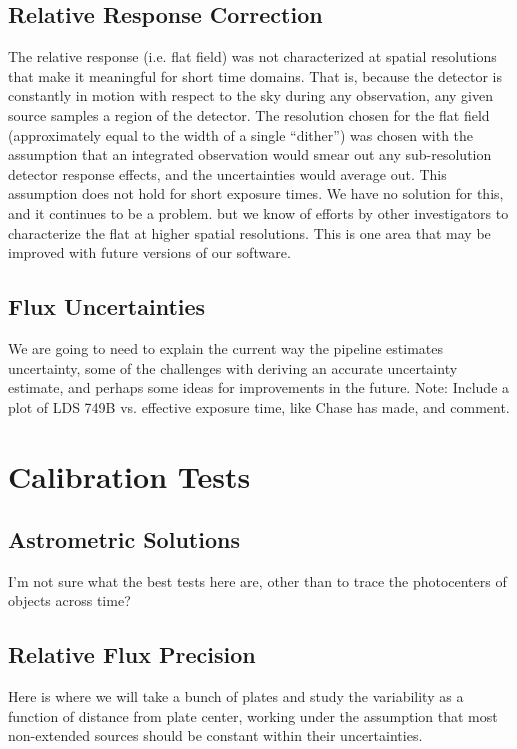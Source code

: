 \documentclass[preprint]{aastex}
\begin{document}
\subsection{Relative Response Correction}
The relative response (i.e. flat field) was not characterized at spatial resolutions that make it meaningful for short time domains. That is, because the detector is constantly in motion with respect to the sky during any observation, any given source samples a region of the detector. The resolution chosen for the flat field (approximately equal to the width of a single ``dither'') was chosen with the assumption that an integrated observation would smear out any sub-resolution detector response effects, and the uncertainties would average out. This assumption does not hold for short exposure times. We have no solution for this, and it continues to be a problem. but we know of efforts by other investigators to characterize the flat at higher spatial resolutions.  This is one area that may be improved with future versions of our software.

\subsection{Flux Uncertainties}
{\color{red}We are going to need to explain the current way the pipeline estimates uncertainty, some of the challenges with deriving an accurate uncertainty estimate, and perhaps some ideas for improvements in the future.}
{\color{red}Note: Include a plot of LDS 749B vs. effective exposure time, like Chase has made, and comment.}

\section{Calibration Tests}
\label{calibration}

\subsection{Astrometric Solutions}
{\color{red}I'm not sure what the best tests here are, other than to trace the photocenters of objects across time?}

\subsection{Relative Flux Precision}
{\color{red}Here is where we will take a bunch of plates and study the variability as a function of distance from plate center, working under the assumption that most non-extended sources should be constant within their uncertainties.}
\end{document}
